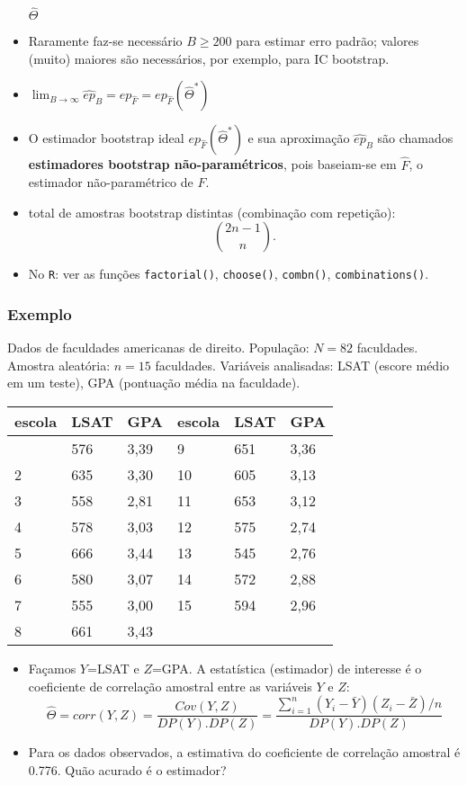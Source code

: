 \documentclass[
  letterpaper,
  DIV=11,
  numbers=noendperiod]{scrreprt}
\begin{document}
\begin{itemize}
  \(\hat\Theta\)
\item
  Raramente faz-se necessário \(B\geq 200\) para estimar erro padrão;
  valores (muito) maiores são necessários, por exemplo, para IC
  bootstrap.
\item
  \(\displaystyle\lim_{B \to \infty} \hat{ep}_B=ep_{\hat{F}}=ep_{\hat{F}}(\hat\Theta^*)\)
\item
  O estimador bootstrap ideal \(ep_{\hat{F}}(\hat\Theta^*)\) e sua
  aproximação \(\hat{ep}_B\) são chamados \textbf{estimadores bootstrap
  não-paramétricos}, pois baseiam-se em \(\hat{F}\), o estimador
  não-paramétrico de \(F\).
\item
  total de amostras bootstrap distintas (combinação com repetição):
  \[\binom{2n -1}{n}.\]
\item
  No \texttt{R}: ver as funções \texttt{factorial()}, \texttt{choose()},
  \texttt{combn()}, \texttt{combinations()}.
\end{itemize}

\subsubsection{Exemplo}\label{exemplo-6}

Dados de faculdades americanas de direito. População: \(N=82\)
faculdades. Amostra aleatória: \(n=15\) faculdades. Variáveis
analisadas: LSAT (escore médio em um teste), GPA (pontuação média na
faculdade).

\begin{longtable}[]{@{}llllll@{}}
\toprule\noalign{}
escola & LSAT & GPA & escola & LSAT & GPA \\
\midrule\noalign{}
\endhead
\bottomrule\noalign{}
\endlastfoot
1 & 576 & 3,39 & 9 & 651 & 3,36 \\
2 & 635 & 3,30 & 10 & 605 & 3,13 \\
3 & 558 & 2,81 & 11 & 653 & 3,12 \\
4 & 578 & 3,03 & 12 & 575 & 2,74 \\
5 & 666 & 3,44 & 13 & 545 & 2,76 \\
6 & 580 & 3,07 & 14 & 572 & 2,88 \\
7 & 555 & 3,00 & 15 & 594 & 2,96 \\
8 & 661 & 3,43 & & & \\
\end{longtable}

\begin{itemize}
\item
  Façamos \(Y\)=LSAT e \(Z\)=GPA. A estatística (estimador) de interesse
  é o coeficiente de correlação amostral entre as variáveis \(Y\) e
  \(Z\):
  \[\hat{\Theta}=corr(Y,Z)=\dfrac{Cov(Y,Z)}{DP(Y).DP(Z)}=\dfrac{\sum_{i=1}^n(Y_i-\bar{Y})(Z_i-\bar{Z})/n}{DP(Y).DP(Z)}\]
\item
  Para os dados observados, a estimativa do coeficiente de correlação
  amostral é 0.776. Quão acurado é o estimador?
\end{itemize}
\end{document}
